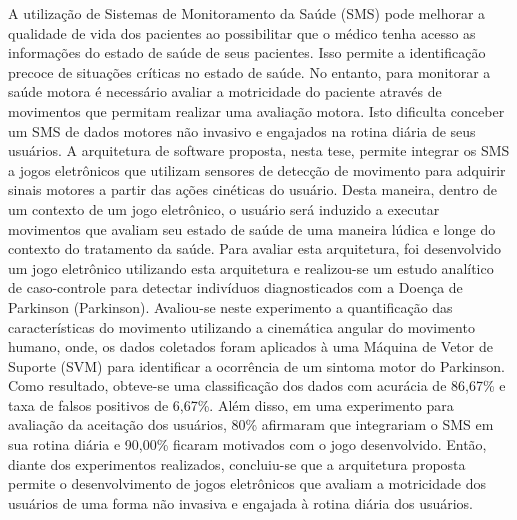A utilização de Sistemas de Monitoramento da Saúde (SMS) pode melhorar a qualidade de vida dos pacientes ao possibilitar que o médico tenha acesso as informações do estado de saúde de seus pacientes. Isso permite a identificação precoce de situações críticas no estado de saúde.
No entanto, para monitorar a saúde motora é necessário avaliar a motricidade do paciente através de movimentos que permitam realizar uma avaliação motora.  Isto dificulta conceber um SMS de dados motores não invasivo e engajados na rotina diária de seus usuários. A arquitetura de software proposta, nesta tese, permite integrar os SMS a jogos eletrônicos que utilizam sensores de detecção de movimento para adquirir sinais motores a partir das ações cinéticas do usuário. Desta maneira, dentro de um contexto de um jogo eletrônico, o usuário será induzido a executar movimentos que avaliam seu estado de saúde de uma maneira lúdica e longe do contexto do tratamento da saúde. Para avaliar esta arquitetura, foi desenvolvido um jogo eletrônico utilizando esta arquitetura e realizou-se um estudo analítico de caso-controle para detectar indivíduos diagnosticados com a Doença de Parkinson (Parkinson). Avaliou-se neste experimento a quantificação das características do movimento utilizando a cinemática angular do movimento humano, onde, os dados coletados foram aplicados à uma Máquina de Vetor de Suporte (SVM) para identificar a ocorrência de um sintoma motor do Parkinson. Como resultado, obteve-se uma classificação dos dados com acurácia de 86,67\% e taxa de falsos positivos de 6,67\%. Além disso, em uma experimento para avaliação da aceitação dos usuários, 80\% afirmaram que integrariam o SMS em sua rotina diária e 90,00\% ficaram motivados com o jogo desenvolvido. Então, diante dos experimentos realizados, concluiu-se que a arquitetura proposta permite o desenvolvimento de jogos eletrônicos que avaliam a motricidade dos usuários de uma forma não invasiva e engajada à rotina diária dos usuários.



